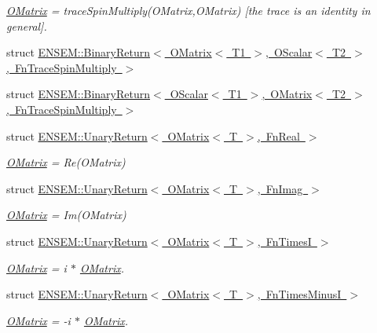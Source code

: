 \begin{DoxyCompactItemize}
\begin{DoxyCompactList}\small\item\em \mbox{\hyperlink{classENSEM_1_1OMatrix}{O\+Matrix}} = trace\+Spin\+Multiply(\+O\+Matrix,\+O\+Matrix) \mbox{[}the trace is an identity in general\mbox{]}. \end{DoxyCompactList}\item 
struct \mbox{\hyperlink{structENSEM_1_1BinaryReturn_3_01OMatrix_3_01T1_01_4_00_01OScalar_3_01T2_01_4_00_01FnTraceSpinMultiply_01_4}{E\+N\+S\+E\+M\+::\+Binary\+Return$<$ O\+Matrix$<$ T1 $>$, O\+Scalar$<$ T2 $>$, Fn\+Trace\+Spin\+Multiply $>$}}
\item 
struct \mbox{\hyperlink{structENSEM_1_1BinaryReturn_3_01OScalar_3_01T1_01_4_00_01OMatrix_3_01T2_01_4_00_01FnTraceSpinMultiply_01_4}{E\+N\+S\+E\+M\+::\+Binary\+Return$<$ O\+Scalar$<$ T1 $>$, O\+Matrix$<$ T2 $>$, Fn\+Trace\+Spin\+Multiply $>$}}
\item 
struct \mbox{\hyperlink{structENSEM_1_1UnaryReturn_3_01OMatrix_3_01T_01_4_00_01FnReal_01_4}{E\+N\+S\+E\+M\+::\+Unary\+Return$<$ O\+Matrix$<$ T $>$, Fn\+Real $>$}}
\begin{DoxyCompactList}\small\item\em \mbox{\hyperlink{classENSEM_1_1OMatrix}{O\+Matrix}} = Re(\+O\+Matrix) \end{DoxyCompactList}\item 
struct \mbox{\hyperlink{structENSEM_1_1UnaryReturn_3_01OMatrix_3_01T_01_4_00_01FnImag_01_4}{E\+N\+S\+E\+M\+::\+Unary\+Return$<$ O\+Matrix$<$ T $>$, Fn\+Imag $>$}}
\begin{DoxyCompactList}\small\item\em \mbox{\hyperlink{classENSEM_1_1OMatrix}{O\+Matrix}} = Im(\+O\+Matrix) \end{DoxyCompactList}\item 
struct \mbox{\hyperlink{structENSEM_1_1UnaryReturn_3_01OMatrix_3_01T_01_4_00_01FnTimesI_01_4}{E\+N\+S\+E\+M\+::\+Unary\+Return$<$ O\+Matrix$<$ T $>$, Fn\+Times\+I $>$}}
\begin{DoxyCompactList}\small\item\em \mbox{\hyperlink{classENSEM_1_1OMatrix}{O\+Matrix}} = i $\ast$ \mbox{\hyperlink{classENSEM_1_1OMatrix}{O\+Matrix}}. \end{DoxyCompactList}\item 
struct \mbox{\hyperlink{structENSEM_1_1UnaryReturn_3_01OMatrix_3_01T_01_4_00_01FnTimesMinusI_01_4}{E\+N\+S\+E\+M\+::\+Unary\+Return$<$ O\+Matrix$<$ T $>$, Fn\+Times\+Minus\+I $>$}}
\begin{DoxyCompactList}\small\item\em \mbox{\hyperlink{classENSEM_1_1OMatrix}{O\+Matrix}} = -\/i $\ast$ \mbox{\hyperlink{classENSEM_1_1OMatrix}{O\+Matrix}}. \end{DoxyCompactList}\item 

\end{DoxyCompactItemize}
